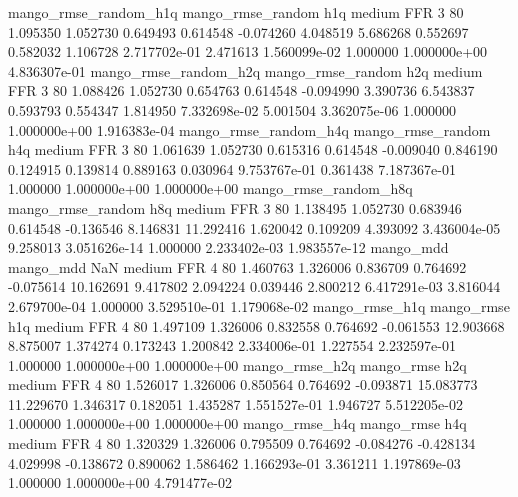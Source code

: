 mango_rmse_random_h1q mango_rmse_random                  h1q     medium      FFR                 3 80  1.095350       1.052730 0.649493       0.614548   -0.074260      4.048519      5.686268     0.552697       0.582032  1.106728 2.717702e-01     2.471613   1.560099e-02            1.000000    1.000000e+00        4.836307e-01
mango_rmse_random_h2q mango_rmse_random                  h2q     medium      FFR                 3 80  1.088426       1.052730 0.654763       0.614548   -0.094990      3.390736      6.543837     0.593793       0.554347  1.814950 7.332698e-02     5.001504   3.362075e-06            1.000000    1.000000e+00        1.916383e-04
mango_rmse_random_h4q mango_rmse_random                  h4q     medium      FFR                 3 80  1.061639       1.052730 0.615316       0.614548   -0.009040      0.846190      0.124915     0.139814       0.889163  0.030964 9.753767e-01     0.361438   7.187367e-01            1.000000    1.000000e+00        1.000000e+00
mango_rmse_random_h8q mango_rmse_random                  h8q     medium      FFR                 3 80  1.138495       1.052730 0.683946       0.614548   -0.136546      8.146831     11.292416     1.620042       0.109209  4.393092 3.436004e-05     9.258013   3.051626e-14            1.000000    2.233402e-03        1.983557e-12
            mango_mdd         mango_mdd                  NaN     medium      FFR                 4 80  1.460763       1.326006 0.836709       0.764692   -0.075614     10.162691      9.417802     2.094224       0.039446  2.800212 6.417291e-03     3.816044   2.679700e-04            1.000000    3.529510e-01        1.179068e-02
       mango_rmse_h1q        mango_rmse                  h1q     medium      FFR                 4 80  1.497109       1.326006 0.832558       0.764692   -0.061553     12.903668      8.875007     1.374274       0.173243  1.200842 2.334006e-01     1.227554   2.232597e-01            1.000000    1.000000e+00        1.000000e+00
       mango_rmse_h2q        mango_rmse                  h2q     medium      FFR                 4 80  1.526017       1.326006 0.850564       0.764692   -0.093871     15.083773     11.229670     1.346317       0.182051  1.435287 1.551527e-01     1.946727   5.512205e-02            1.000000    1.000000e+00        1.000000e+00
       mango_rmse_h4q        mango_rmse                  h4q     medium      FFR                 4 80  1.320329       1.326006 0.795509       0.764692   -0.084276     -0.428134      4.029998    -0.138672       0.890062  1.586462 1.166293e-01     3.361211   1.197869e-03            1.000000    1.000000e+00        4.791477e-02
